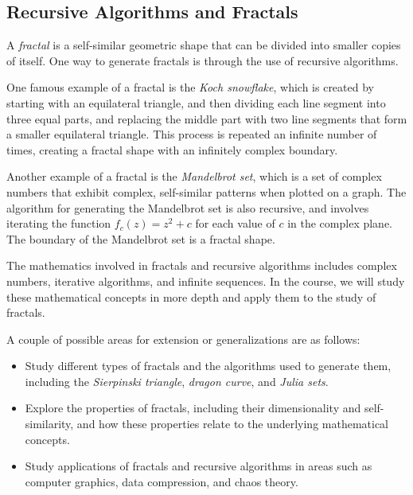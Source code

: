 \documentclass{article}
\begin{document}
\pagebreak

\subsection*{Recursive Algorithms and Fractals}
    A \textit{fractal} is a self-similar geometric shape that can be divided into smaller copies of itself. One way to generate fractals is through the use of recursive algorithms.
    
    \vspace{3mm}
    One famous example of a fractal is the \textit{Koch snowflake}, which is created by starting with an equilateral triangle, and then dividing each line segment into three equal parts, and replacing the middle part with two line segments that form a smaller equilateral triangle. This process is repeated an infinite number of times, creating a fractal shape with an infinitely complex boundary.
    
    \vspace{3mm}
    Another example of a fractal is the \textit{Mandelbrot set}, which is a set of complex numbers that exhibit complex, self-similar patterns when plotted on a graph. The algorithm for generating the Mandelbrot set is also recursive, and involves iterating the function $f_{c}(z) = z^{2} + c$ for each value of $c$ in the complex plane. The boundary of the Mandelbrot set is a fractal shape.
    
    \vspace{3mm}
    The mathematics involved in fractals and recursive algorithms includes complex numbers, iterative algorithms, and infinite sequences. In the course, we will study these mathematical concepts in more depth and apply them to the study of fractals.
    
    \vspace{3mm}
    A couple of possible areas for extension or generalizations are as follows:
    \begin{itemize}
    \item Study different types of fractals and the algorithms used to generate them, including the \textit{Sierpinski triangle}, \textit{dragon curve}, and \textit{Julia sets}.
    \item Explore the properties of fractals, including their dimensionality and self-similarity, and how these properties relate to the underlying mathematical concepts.
    \item Study applications of fractals and recursive algorithms in areas such as computer graphics, data compression, and chaos theory.
    \end{itemize}
\end{document}
